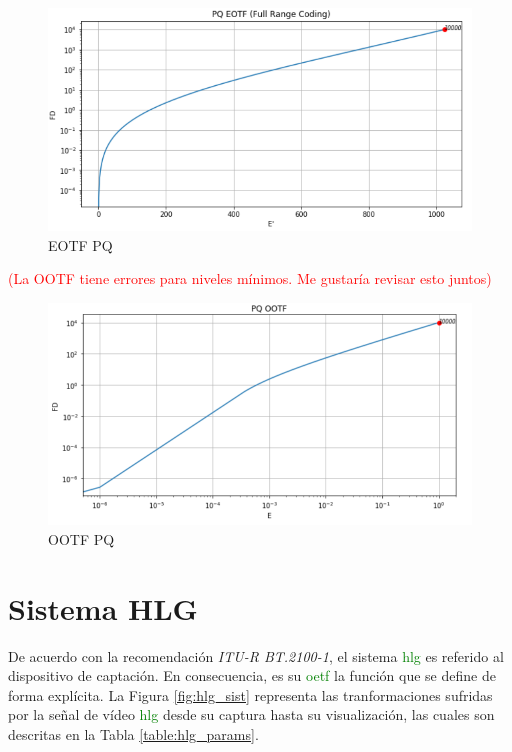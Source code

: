 \documentclass[a4paper, 12pt]{report}
\begin{document}
\begin{figure}[H]
  \centering
  \includegraphics[width=12cm, keepaspectratio]{img/4_Formatos_de_TV_HDR/4_1_Sistema_PQ/3_eotf_full_range_log_lin.png}
  \caption{EOTF PQ}
  \label{fig:pq_graph_eotf}
\end{figure}

\textcolor{red}{(La OOTF tiene errores para niveles mínimos. Me gustaría revisar esto juntos)}
\begin{figure}[H]
  \centering
  \includegraphics[width=12cm, keepaspectratio]{img/4_Formatos_de_TV_HDR/4_1_Sistema_PQ/4_ootf_log_log.png}
  \caption{OOTF PQ}
  \label{fig:pq_graph_ootf}
\end{figure}

\section{Sistema HLG}
\label{sec:sistema_hlg_teoria}

De acuerdo con la recomendación \textit{ITU-R BT.2100-1}, el sistema \textcolor{green}{hlg} es referido al dispositivo de captación. En consecuencia, es su \textcolor{green}{oetf} la función que se define de forma explícita. La Figura \ref{fig:hlg_sist} representa las tranformaciones sufridas por la señal de vídeo \textcolor{green}{hlg} desde su captura hasta su visualización, las cuales son descritas en la Tabla \ref{table:hlg_params}. 
\end{document}
